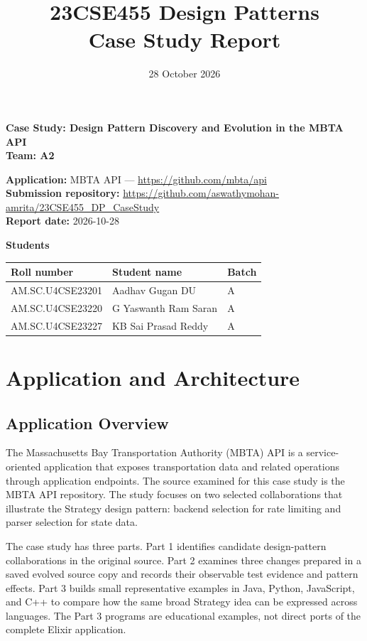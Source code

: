 \documentclass[11pt,a4paper]{article}
\title{\textbf{23CSE455 Design Patterns}\\Case Study Report}
\date{28 October 2026}
\begin{document}
\maketitle
\begin{center}
\textbf{Case Study: Design Pattern Discovery and Evolution in the MBTA API}\\[4pt]
\textbf{Team: A2}
\end{center}
\textbf{Application:} MBTA API — \url{https://github.com/mbta/api}\\
\textbf{Submission repository:} \url{https://github.com/aswathymohan-amrita/23CSE455_DP_CaseStudy}\\
\textbf{Report date:} 2026-10-28

\textbf{Students}
\begin{tabularx}{\linewidth}{@{}lXl@{}}
\toprule Roll number & Student name & Batch\\ \midrule
AM.SC.U4CSE23201 & Aadhav Gugan DU & A\\
AM.SC.U4CSE23220 & G Yaswanth Ram Saran & A\\
AM.SC.U4CSE23227 & KB Sai Prasad Reddy & A\\
\bottomrule
\end{tabularx}


\tableofcontents
\newpage

\section{Application and Architecture}
\subsection{Application Overview}
The Massachusetts Bay Transportation Authority (MBTA) API is a service-oriented application that exposes transportation data and related operations through application endpoints. The source examined for this case study is the MBTA API repository. The study focuses on two selected collaborations that illustrate the Strategy design pattern: backend selection for rate limiting and parser selection for state data.

The case study has three parts. Part 1 identifies candidate design-pattern collaborations in the original source. Part 2 examines three changes prepared in a saved evolved source copy and records their observable test evidence and pattern effects. Part 3 builds small representative examples in Java, Python, JavaScript, and C++ to compare how the same broad Strategy idea can be expressed across languages. The Part 3 programs are educational examples, not direct ports of the complete Elixir application.
\end{document}

